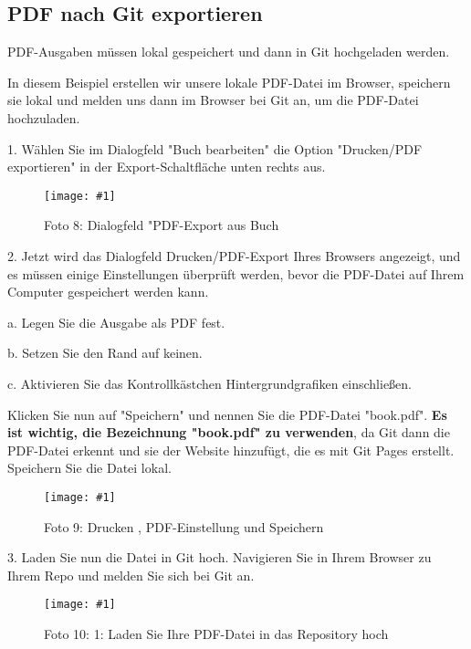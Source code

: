 \documentclass{article}
\newlength{\imgwidth}
\newcommand\scaledgraphics[2]{%
                
\settowidth{\imgwidth}{\texttt{[image: \#1]}}%
                
\setlength{\imgwidth}{\minof{\imgwidth}{#2\textwidth}}%
                
\texttt{[image: \#1]}%
                
}
\begin{document}
\subsection{PDF nach Git exportieren}\label{H7212347}



PDF-Ausgaben müssen lokal gespeichert und dann in Git hochgeladen werden.


In diesem Beispiel erstellen wir unsere lokale PDF-Datei im Browser, speichern sie lokal und melden uns dann im Browser bei Git an, um die PDF-Datei hochzuladen.


1. Wählen Sie im Dialogfeld "Buch bearbeiten" die Option "Drucken/PDF exportieren" in der Export-Schaltfläche unten rechts aus.

\begin{figure}
\scaledgraphics{1046d398-157b-4a6e-a913-6b8e0c0a3c49.png}{1}
\caption*{Foto 8: Dialogfeld "PDF-Export aus Buch}\label{F9611051}
\end{figure}


2. Jetzt wird das Dialogfeld Drucken/PDF-Export Ihres Browsers angezeigt, und es müssen einige Einstellungen überprüft werden, bevor die PDF-Datei auf Ihrem Computer gespeichert werden kann.


a. Legen Sie die Ausgabe als PDF fest.


b. Setzen Sie den Rand auf keinen.


c. Aktivieren Sie das Kontrollkästchen Hintergrundgrafiken einschließen.


Klicken Sie nun auf "Speichern" und nennen Sie die PDF-Datei "book.pdf". \textbf{Es ist wichtig, die Bezeichnung "book.pdf" zu verwenden}, da Git dann die PDF-Datei erkennt und sie der Website hinzufügt, die es mit Git Pages erstellt. Speichern Sie die Datei lokal.

\begin{figure}
\scaledgraphics{adc93bc9-4c8b-49e7-8628-6cbc54625f47.png}{1}
\caption*{Foto 9: Drucken , PDF-Einstellung und Speichern}\label{F45019311}
\end{figure}


3. Laden Sie nun die Datei in Git hoch. Navigieren Sie in Ihrem Browser zu Ihrem Repo und melden Sie sich bei Git an.

\begin{figure}
\scaledgraphics{339fafc3-0e4a-49b0-96b0-4f0376eb7eb0.png}{1}
\caption*{Foto 10:  1: Laden Sie Ihre PDF-Datei in das Repository hoch}\label{F99448091}
\end{figure}
\end{document}
